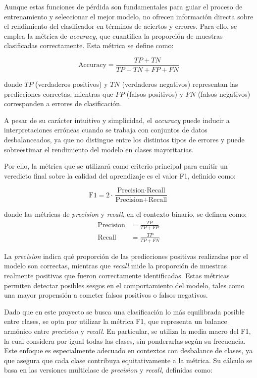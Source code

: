 Aunque estas funciones de pérdida son fundamentales para guiar el proceso de entrenamiento y seleccionar el mejor modelo, no ofrecen información directa sobre el rendimiento del clasificador en términos de aciertos y errores. Para ello, se emplea la métrica de \textit{accuracy}, que cuantifica la proporción de muestras clasificadas correctamente. Esta métrica se define como:

\begin{equation}
\text{Accuracy} = \frac{TP + TN}{TP + TN + FP + FN}
\end{equation}

donde $TP$ (verdaderos positivos) y $TN$ (verdaderos negativos) representan las predicciones correctas, mientras que $FP$ (falsos positivos) y $FN$ (falsos negativos) corresponden a errores de clasificación.

A pesar de su carácter intuitivo y simplicidad, el \textit{accuracy} puede inducir a interpretaciones erróneas cuando se trabaja con conjuntos de datos desbalanceados, ya que no distingue entre los distintos tipos de errores y puede sobreestimar el rendimiento del modelo en clases mayoritarias.

Por ello, la métrica que se utilizará como criterio principal para emitir un veredicto final sobre la calidad del aprendizaje es el valor F1, definido como:

\begin{equation}
    \text{F1} = 2 \cdot \frac{\text{Precision} \cdot \text{Recall}}{\text{Precision} + \text{Recall}}
    \end{equation}

donde las métricas de \textit{precision} y \textit{recall}, en el contexto binario, se definen como:
\begin{align}
    \text{Precision} &= \frac{TP}{TP + FP} \\
    \text{Recall} &= \frac{TP}{TP + FN}
\end{align}

La \textit{precision} indica qué proporción de las predicciones positivas realizadas por el modelo son correctas, mientras que \textit{recall} mide la proporción de muestras realmente positivas que fueron correctamente identificadas. Estas métricas permiten detectar posibles sesgos en el comportamiento del modelo, tales como una mayor propensión a cometer falsos positivos o falsos negativos.

Dado que en este proyecto se busca una clasificación lo más equilibrada posible entre clases, se opta por utilizar la métrica F1, que representa un balance armónico entre \textit{precision} y \textit{recall}. En particular, se utiliza la media macro del F1, la cual considera por igual todas las clases, sin ponderarlas según su frecuencia. Este enfoque es especialmente adecuado en contextos con desbalance de clases, ya que asegura que cada clase contribuya equitativamente a la métrica. Su cálculo se basa en las versiones multiclase de \textit{precision} y \textit{recall}, definidas como:

